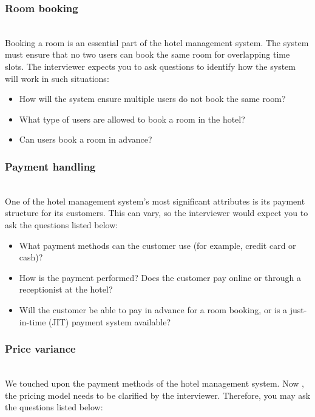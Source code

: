 \subsubsection{Room booking}\label{S57f24fOQm77LOeMGqBoy}
\\
Booking a room is an essential part of the hotel management system. The system must ensure that no two users can book the same room for overlapping time slots. The interviewer expects you to ask questions to identify how the system will work in such situations:

\begin{itemize}
\item
\protect{}\label{sQKVYkLePfh76XQHz_73n}
How will the system ensure multiple users do not book the same room?
\item
\protect{}\label{ohIEAiRh0F7Hs0zonxRw0}
What type of users are allowed to book a room in the hotel?
\item
\protect{}\label{8Q7MD1Ciw4MtLbpSt8gwt}
Can users book a room in advance?
\end{itemize}

\subsubsection{Payment handling}\label{3xcK8PHmI1RSz7-AappTG}
\\
One of the hotel management system's most significant attributes is its payment structure for its customers. This can vary, so the interviewer would expect you to ask the questions listed below:

\begin{itemize}
\item
\protect{}\label{NzQoecHO5kQE_e-gQVnGr}
What payment methods can the customer use (for example, credit card or cash)?
\item
\protect{}\label{uQ6WThckIB7HO_s5smMS-}
How is the payment performed? Does the customer pay online or through a receptionist at the hotel?
\item
\protect{}\label{w0vljN6qBneOQsyALuQVb}
Will the customer be able to pay in advance for a room booking, or is a just-in-time (JIT) payment system available?
\end{itemize}

\subsubsection{Price variance}\label{5U2Z0593L72YgrNeLvwDw}
\\
We touched upon the payment methods of the hotel management system. Now , the pricing model needs to be clarified by the interviewer. Therefore, you may ask the questions listed below:

